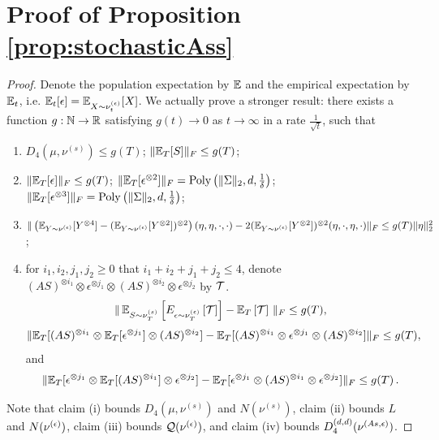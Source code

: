 \onecolumn
\appendix
\section{Proof of Proposition \ref{prop:stochasticAss}}
\label{subsec:proofPropICA_prop1}
\ICAstocCase*
{}
\begin{proof}
	Denote the population expectation by $\mathbb{E}$ and the empirical expectation by $\mathbb{E}_t$, i.e. $\mathbb{E}_t[\epsilon] = \mathbb{E}_{X\sim \nu_t^{(\epsilon)}}[X]$. We actually prove a stronger result: there exists a function $g:\mathbb{N}\rightarrow \mathbb{R}$ satisfying $g(t) \to 0$ as $t \to \infty$ in a rate $\frac{1}{\sqrt{t}}$, such that
	\begin{enumerate}
		\itemsep0em
		\item $D_4(\mu, \nu^{(s)})\le g(T)$; $\| \mathbb{E}_T[S] \|_F \le g(T)$;
		\item $\| \mathbb{E}_T[\epsilon] \|_F \le g(T)$; $\| \mathbb{E}_T[\epsilon^{\otimes 2}] \|_F  = \operatorname{Poly}\left(\|\Sigma\|_2,d,\frac{1}{\delta}\right)$;  $\| \mathbb{E}_T[\epsilon^{\otimes 3}] \|_F  = \operatorname{Poly}\left(\|\Sigma\|_2,d,\frac{1}{\delta}\right)$;
		\item $\| \left(\mathbb{E}_{Y\sim \nu^{(\epsilon)}} [Y^{\otimes4}] - (\mathbb{E}_{Y\sim \nu^{(\epsilon)}} [Y^{\otimes2}])^{\otimes 2}\right)(\eta,\eta,\cdot,\cdot)  - 2 (\mathbb{E}_{Y\sim \nu^{(\epsilon)}} [Y^{\otimes2}])^{\otimes 2}(\eta,\cdot,\eta,\cdot)\|_F \\ \le  g(T) \|\eta\|_2^2$;
		\item for $i_1,i_2,j_1,j_2 \ge 0$ that $i_1+i_2+j_1+j_2 \le 4$, denote $(AS)^{\otimes i_1} \otimes \epsilon^{\otimes j_1} \otimes (AS)^{\otimes i_2} \otimes \epsilon^{\otimes j_2}$ by $\mathcal{T}$. 
		\begin{align*}
		\|\, 
		\mathbb{E}_{S\sim \nu_T^{(s)}}\left[E_{\epsilon\sim \nu_T^{(\epsilon)}}\left[\mathcal{T}\right]\right]- 
		\mathbb{E}_T\left[\mathcal{T}\right] 
		\,\|_F \le  g(T),
		\end{align*}
		\begin{align*}
		\| \mathbb{E}_T[(AS)^{\otimes i_1} \otimes \mathbb{E}_T[\epsilon^{\otimes j_1}] \otimes (AS)^{\otimes i_2}] - \mathbb{E}_T[(AS)^{\otimes i_1}\otimes \epsilon^{\otimes j_1}\otimes (AS)^{\otimes i_2}]  \|_F \le  g(T),
		\end{align*}
		and 
		\begin{align*}
		\| \mathbb{E}_T[\epsilon^{\otimes j_1} \otimes \mathbb{E}_T[(AS)^{\otimes i_1}] \otimes \epsilon^{\otimes j_2}] - \mathbb{E}_T[ \epsilon^{\otimes j_1}\otimes (AS)^{\otimes i_1}\otimes \epsilon^{\otimes j_2}]  \|_F \le  g(T)\,.
		\end{align*}
		\fi
	\end{enumerate}
	Note that claim (i) bounds $D_4(\mu, \nu^{(s)})$ and $N(\nu^{(s)})$, claim (ii) bounds $L$ and $N(\nu^{(\epsilon)})$, claim (iii) bounds $\mathcal{Q}(\nu^{(\epsilon)})$, and claim (iv) bounds $D_4^{(d,d)}(\nu^{(As,\epsilon)})$.
	

\end{proof}
